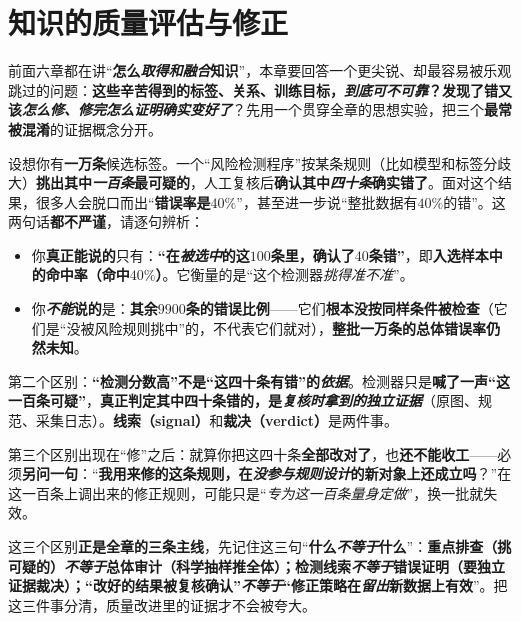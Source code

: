 \chapter{知识的质量评估与修正}
\label{chap:knowledge-quality-assessment-correction}

前面六章都在讲“\textbf{怎么\emph{取得和融合}知识}”，本章要回答一个更尖锐、却最容易被乐观跳过的问题：\textbf{这些辛苦得到的标签、关系、训练目标，\emph{到底可不可靠}？发现了错又该\emph{怎么修、修完怎么证明确实变好了}}？先用一个贯穿全章的思想实验，把三个\textbf{最常被混淆}的证据概念分开。

设想你有\textbf{一万条}候选标签。一个“风险检测程序”按某条规则（比如模型和标签分歧大）\textbf{挑出其中\emph{一百条}最可疑的}，人工复核后\textbf{确认其中\emph{四十条}确实错了}。面对这个结果，很多人会脱口而出“\textbf{错误率是$40\%$}”，甚至进一步说“整批数据有$40\%$的错”。这两句话\textbf{都不严谨}，请逐句辨析：
\begin{itemize}\item 你\textbf{真正能说的}只有：\textbf{“在\emph{被选中}的这$100$条里，确认了$40$条错”}，即\textbf{入选样本中的命中率（命中$40\%$）}。它衡量的是“这个检测器\emph{挑得准不准}”。\item 你\textbf{\emph{不能}说的}是：\textbf{其余$9900$条的错误比例}——它们\textbf{根本没按同样条件被检查}（它们是“没被风险规则挑中”的，不代表它们就对），\textbf{整批一万条的总体错误率仍然未知}。\end{itemize}
第二个区别：\textbf{“检测分数高”不是“这四十条有错”的\emph{依据}}。检测器只是\textbf{喊了一声“这一百条可疑”}，\textbf{真正判定其中四十条错的，是\emph{复核时拿到的独立证据}}（原图、规范、采集日志）。\textbf{线索（signal）}和\textbf{裁决（verdict）}是两件事。

第三个区别出现在“修”之后：就算你把这四十条\textbf{全部改对了}，也\textbf{还不能收工}——必须\textbf{另问一句}：“\textbf{我用来修的这条规则，在\emph{没参与规则设计}的新对象上还成立吗}？”在这一百条上调出来的修正规则，可能只是“\emph{专为这一百条量身定做}”，换一批就失效。

这三个区别\textbf{正是全章的三条主线}，先记住这三句“\textbf{什么\emph{不等于}什么}”：\textbf{重点排查（挑可疑的）\emph{不等于}总体审计（科学抽样推全体）；检测线索\emph{不等于}错误证明（要独立证据裁决）；“改好的结果被复核确认”\emph{不等于}“修正策略在\emph{留出}新数据上有效}”。把这三件事分清，质量改进里的证据才不会被夸大。

